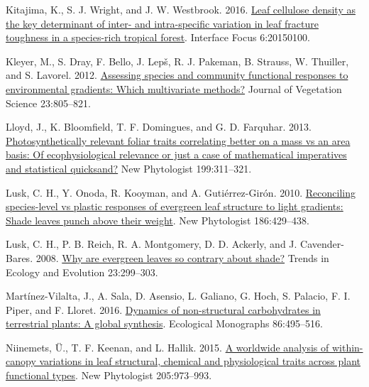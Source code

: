 \documentclass[
  12pt,
]{article}
\newlength{\cslhangindent} %
\newlength{\cslentryspacingunit} %
\newenvironment{CSLReferences}[2] %
 {%
  \setlength{\parindent}{0pt} %
  \ifodd #1 %
  \let\oldpar\par %
  \def\par{\hangindent=\cslhangindent\oldpar} %
  \fi %
  \setlength{\parskip}{#2\cslentryspacingunit} %
 }%
 {} %
\providecommand{\DIFdelbegin}{} %
\providecommand{\DIFdelend}{} %
\newcommand{\DIFscaledelfig}{0.5}
\newlength{\DIFdelgraphicswidth} %
\newlength{\DIFdelgraphicsheight} %
\newcommand{\DIFdelincludegraphics}[2][]{%
\sbox{\DIFdelgraphicsbox}{\DIFOincludegraphics[#1]{#2}}%
\settoboxwidth{\DIFdelgraphicswidth}{\DIFdelgraphicsbox} %
\settoboxtotalheight{\DIFdelgraphicsheight}{\DIFdelgraphicsbox} %
\scalebox{\DIFscaledelfig}{%
\parbox[b]{\DIFdelgraphicswidth}{\usebox{\DIFdelgraphicsbox}\\[-\baselineskip] \rule{\DIFdelgraphicswidth}{0em}}\llap{\resizebox{\DIFdelgraphicswidth}{\DIFdelgraphicsheight}{%
\setlength{\unitlength}{\DIFdelgraphicswidth}%
\begin{picture}(1,1)%
\thicklines\linethickness{2pt} %
{\color[rgb]{1,0,0}\put(0,0){\framebox(1,1){}}}%
{\color[rgb]{1,0,0}\put(0,0){\line( 1,1){1}}}%
{\color[rgb]{1,0,0}\put(0,1){\line(1,-1){1}}}%
\end{picture}%
}\hspace*{3pt}}} %
} %
\DeclareRobustCommand{\DIFdelbegin}{\DIFOdelbegin \let\includegraphics\DIFdelincludegraphics} %
\DeclareRobustCommand{\DIFdelend}{\DIFOaddend \let\includegraphics\DIFOincludegraphics} %
\begin{document}
\begin{CSLReferences}{1}{0}
\leavevmode{}%
Kitajima, K., S. J. Wright, and J. W. Westbrook. 2016. \href{https://doi.org/10.1098/rsfs.2015.0100}{Leaf cellulose density as the key determinant of inter- and intra-specific variation in leaf fracture toughness in a species-rich tropical forest}. Interface Focus 6:20150100.

\leavevmode{}%
Kleyer, M., S. Dray, F. Bello, J. Lepš, R. J. Pakeman, B. Strauss, W. Thuiller, and S. Lavorel. 2012. \href{https://doi.org/10.1111/j.1654-1103.2012.01402.x}{Assessing species and community functional responses to environmental gradients: \DIFdelbegin %
\DIFdelend Which \DIFdelbegin %
\DIFdelend multivariate methods?} Journal of Vegetation Science 23:805--821.

\leavevmode{}%
Lloyd, J., K. Bloomfield, T. F. Domingues, and G. D. Farquhar. 2013. \href{https://doi.org/10.1111/nph.12281}{Photosynthetically relevant foliar traits correlating better on a mass vs an area basis: \DIFdelbegin %
\DIFdelend Of \DIFdelbegin %
\DIFdelend ecophysiological relevance or just a case of mathematical imperatives and statistical quicksand?} New Phytologist 199:311--321.

\leavevmode{}%
Lusk, C. H., Y. Onoda, R. Kooyman, and A. Gutiérrez-Girón. 2010. \href{https://doi.org/10.1111/j.1469-8137.2010.03202.x}{Reconciling species-level vs plastic responses of evergreen leaf structure to light gradients: \DIFdelbegin %
\DIFdelend Shade \DIFdelbegin %
\DIFdelend leaves punch above their weight}. New Phytologist 186:429--438.

\leavevmode{}%
Lusk, C. H., P. B. Reich, R. A. Montgomery, D. D. Ackerly, and J. Cavender-Bares. 2008. \href{https://doi.org/10.1016/j.tree.2008.02.006}{Why are evergreen leaves so contrary about shade?} Trends in Ecology and Evolution 23:299--303.

\leavevmode{}%
Martínez-Vilalta, J., A. Sala, D. Asensio, L. Galiano, G. Hoch, S. Palacio, F. I. Piper, and F. Lloret. 2016. \href{https://doi.org/10.1002/ecm.1231}{Dynamics of non-structural carbohydrates in terrestrial plants: A global synthesis}. Ecological Monographs 86:495--516.

\leavevmode{}%
Niinemets, Ü., T. F. Keenan, and L. Hallik. 2015. \href{https://doi.org/10.1111/nph.13096}{A worldwide analysis of within-canopy variations in leaf structural, chemical and physiological traits across plant functional types}. New Phytologist 205:973--993.


\end{CSLReferences}
\end{document}
